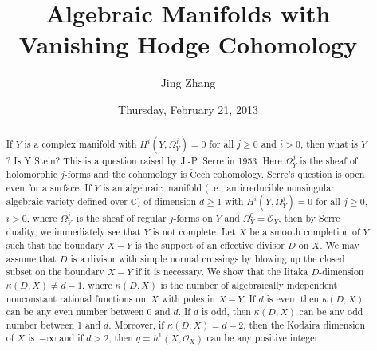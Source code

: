 \documentclass{UAmathtalk}
\author{Jing Zhang}
\title{Algebraic Manifolds with\\ Vanishing Hodge Cohomology}
\date{Thursday, February 21, 2013}
\begin{document}
\maketitle

\begin{abstract}
If $Y$ is a complex manifold with $H^i (Y, \Omega^j_Y)=0$ for all $j\geq 0$ and $i>0$, then what is $Y$? Is Y Stein? This is a question raised by J.-P. Serre in 1953. Here $\Omega^j_Y$ is the sheaf of holomorphic $j$-forms and the cohomology is ${\check{\mbox{C}}}$ech cohomology. Serre's question is open even for a surface.  If $Y$ is an algebraic manifold (i.e., an irreducible nonsingular algebraic variety defined over $\mathbb{C}$) of dimension $d\geq 1$ with $H^i(Y, \Omega^j_Y)=0$ for all $j\geq 0$, $i>0$, where $\Omega^j_Y$~is the sheaf of regular $j$-forms on $Y$ and $\Omega^0_Y= {\mathcal{O}}_Y$, then by Serre duality, we immediately see that $Y$ is not complete. Let $X$ be a smooth completion of $Y$ such that the boundary $X-Y$ is the support of an effective divisor $D$ on $X$. We may assume that $D$ is a divisor with simple normal crossings by blowing up the closed subset on the boundary $X-Y$ if it is necessary. We show that the Iitaka $D$-dimension $\kappa(D, X)\neq d-1$, where $\kappa(D, X)$ is the number of algebraically independent nonconstant rational functions on~$X$ with poles in $X-Y$. If $d$ is even, then $\kappa(D, X)$ can be any even number between 0 and $d$. If $d$ is odd, then $\kappa(D, X)$ can be any odd number between 1 and $d$. Moreover, if $\kappa(D,X)= d-2$, then the Kodaira dimension of $X$ is~$-\infty$ and if $d>2$, then $q=h^1(X, {\mathcal{O}}_X)$ can be any positive integer.
\end{abstract}
\end{document}
